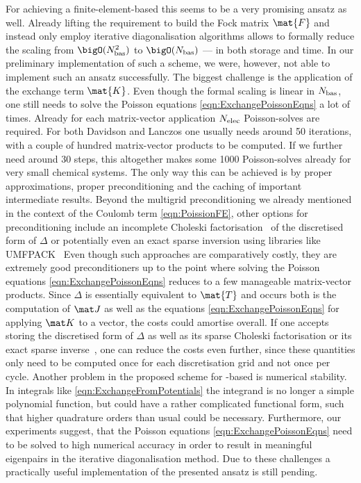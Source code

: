 For achieving a finite-element-based \HF
this seems to be a very promising ansatz as well.
Already lifting the requirement to build the Fock matrix $\mat{F}$
and instead only employ
iterative diagonalisation algorithms
allows to formally reduce the scaling from $\bigO(\Nbas^2)$ to $\bigO(\Nbas)$
--- in both storage and time.
In our preliminary implementation of such a scheme,
we were, however, not able to implement such an ansatz successfully.
The biggest challenge is
the application of the exchange term $\mat{K}$.
Even though the formal scaling is linear in $N_\text{bas}$,
one still needs to solve the Poisson equations \eqref{eqn:ExchangePoissonEqns}
a lot of times.
Already for each matrix-vector application
$N_\text{elec}$ Poisson-solves are required.
For both Davidson and Lanczos one usually needs around 50 iterations,
with a couple of hundred matrix-vector products to be computed.
If we further need around 30 \SCF steps,
this altogether makes some 1000 Poisson-solves
already for very small chemical systems.
The only way this can be achieved is by
proper approximations, proper preconditioning and
the caching of important intermediate results.
Beyond the multigrid preconditioning we already mentioned
in the context of the Coulomb term \eqref{eqn:PoissionFE},
other options for preconditioning include
an incomplete Choleski factorisation~\cite{Lin1999}
of the discretised form of $\Delta$
or potentially even an exact sparse inversion
using libraries like UMFPACK~\cite{Davis2004}
Even though such approaches are comparatively costly,
they are extremely good preconditioners up to the point
where solving the Poisson equations \eqref{eqn:ExchangePoissonEqns}
reduces to a few manageable matrix-vector products.
Since $\Delta$ is essentially equivalent to $\mat{T}$
and occurs both is the computation of $\matJ$
as well as the equations \eqref{eqn:ExchangePoissonEqns}
for applying $\matK$ to a vector, the costs could amortise overall.
If one accepts storing the discretised form of $\Delta$
as well as its sparse Choleski factorisation
or its exact sparse inverse~\cite{Davis2004},
one can reduce the costs even further,
since these quantities only need to be computed
once for each discretisation grid and not once per \SCF cycle.
Another problem in the proposed scheme for \FE-based \HF is numerical stability.
In integrals like \eqref{eqn:ExchangeFromPotentials}
the integrand is no longer a simple polynomial function,
but could have a rather complicated functional form,
such that higher quadrature orders than usual
could be necessary.
Furthermore, our experiments suggest,
that the Poisson equations \eqref{eqn:ExchangePoissonEqns}
need to be solved to high numerical accuracy
in order to result in meaningful eigenpairs
in the iterative diagonalisation method.
Due to these challenges a practically useful implementation
of the presented ansatz is still pending.


